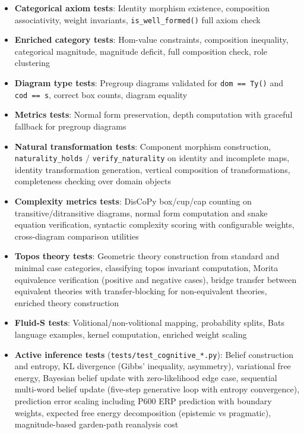 \documentclass[
]{article}
\providecommand{\tightlist}{%
  \setlength{\itemsep}{0pt}\setlength{\parskip}{0pt}}
\begin{document}
\begin{itemize}
\tightlist
\item
  \textbf{Categorical axiom tests}: Identity morphism existence,
  composition associativity, weight invariants,
  \texttt{is\_well\_formed()} full axiom check
\item
  \textbf{Enriched category tests}: Hom-value constraints, composition
  inequality, categorical magnitude, magnitude deficit, full composition
  check, role clustering
\item
  \textbf{Diagram type tests}: Pregroup diagrams validated for
  \texttt{dom\ ==\ Ty()} and \texttt{cod\ ==\ s}, correct box counts,
  diagram equality
\item
  \textbf{Metrics tests}: Normal form preservation, depth computation
  with graceful fallback for pregroup diagrams
\item
  \textbf{Natural transformation tests}: Component morphism
  construction, \texttt{naturality\_holds} / \texttt{verify\_naturality}
  on identity and incomplete maps, identity transformation generation,
  vertical composition of transformations, completeness checking over
  domain objects
\item
  \textbf{Complexity metrics tests}: DisCoPy box/cup/cap counting on
  transitive/ditransitive diagrams, normal form computation and snake
  equation verification, syntactic complexity scoring with configurable
  weights, cross-diagram comparison utilities
\item
  \textbf{Topos theory tests}: Geometric theory construction from
  standard and minimal case categories, classifying topos invariant
  computation, Morita equivalence verification (positive and negative
  cases), bridge transfer between equivalent theories with
  transfer-blocking for non-equivalent theories, enriched theory
  construction
\item
  \textbf{Fluid-S tests}: Volitional/non-volitional mapping, probability
  splits, Bats language examples, kernel computation, enriched weight
  scaling
\item
  \textbf{Active inference tests}
  (\texttt{tests/test\_cognitive\_*.py}): Belief construction and
  entropy, KL divergence (Gibbs' inequality, asymmetry), variational
  free energy, Bayesian belief update with zero-likelihood edge case,
  sequential multi-word belief update (five-step generative loop with
  entropy convergence), prediction error scaling including P600 ERP
  prediction with boundary weights, expected free energy decomposition
  (epistemic vs pragmatic), magnitude-based garden-path reanalysis cost

\end{itemize}
\end{document}
